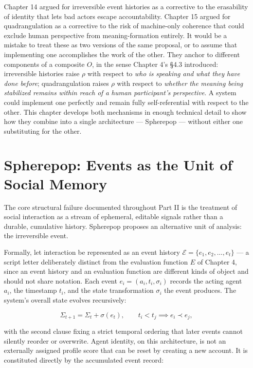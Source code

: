 \documentclass[12pt,a4paper]{book}
\begin{document}
Chapter 14 argued for irreversible event histories as a corrective to the erasability of identity that lets bad actors escape accountability. Chapter 15 argued for quadrangulation as a corrective to the risk of machine-only coherence that could exclude human perspective from meaning-formation entirely. It would be a mistake to treat these as two versions of the same proposal, or to assume that implementing one accomplishes the work of the other. They anchor to different components of a composite $O$, in the sense Chapter 4's §4.3 introduced: irreversible histories raise $\rho$ with respect to \emph{who is speaking and what they have done before}; quadrangulation raises $\rho$ with respect to \emph{whether the meaning being stabilized remains within reach of a human participant's perspective}. A system could implement one perfectly and remain fully self-referential with respect to the other. This chapter develops both mechanisms in enough technical detail to show how they combine into a single architecture — Spherepop — without either one substituting for the other.

\section{Spherepop: Events as the Unit of Social Memory}

The core structural failure documented throughout Part II is the treatment of social interaction as a stream of ephemeral, editable signals rather than a durable, cumulative history. Spherepop proposes an alternative unit of analysis: the irreversible event.

Formally, let interaction be represented as an event history $\mathcal{E} = \{e_1, e_2, \ldots, e_t\}$ — a script letter deliberately distinct from the evaluation function $E$ of Chapter 4, since an event history and an evaluation function are different kinds of object and should not share notation. Each event $e_i = (a_i, t_i, \sigma_i)$ records the acting agent $a_i$, the timestamp $t_i$, and the state transformation $\sigma_i$ the event produces. The system's overall state evolves recursively:

\[\Sigma_{t+1} = \Sigma_t + \sigma(e_t), \qquad t_i < t_j \implies e_i \prec e_j,\]

with the second clause fixing a strict temporal ordering that later events cannot silently reorder or overwrite. Agent identity, on this architecture, is not an externally assigned profile score that can be reset by creating a new account. It is constituted directly by the accumulated event record:
\end{document}
